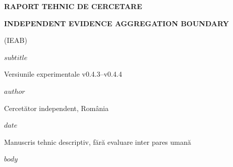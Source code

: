 \documentclass[12pt,a4paper]{article}
\renewcommand{\_}{\textunderscore\allowbreak}
\begin{document}
\pagestyle{plain}
\begin{center}
\vspace*{3cm}
{\bfseries RAPORT TEHNIC DE CERCETARE\par}
\vspace{2.2cm}
{\large\bfseries INDEPENDENT EVIDENCE AGGREGATION BOUNDARY\par (IEAB)\par}
\vspace{1cm}
{\bfseries $subtitle$\par}
\vspace{1.5cm}
Versiunile experimentale v0.4.3--v0.4.4\par
\vspace{2cm}
{\bfseries $author$\par}
Cercetător independent, România\par
\vfill
$date$\par
{\small Manuscris tehnic descriptiv, fără evaluare inter pares umană\par}
\end{center}
\clearpage
{\singlespacing\tableofcontents}
\clearpage
$body$
\end{document}
